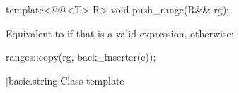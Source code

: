 \documentclass{wg21}
\begin{document}
\begin{addedblock}
\begin{itemdecl}
template<@@<T> R>
void push_range(R&& rg);
\end{itemdecl}

\begin{itemdescr}
    \pnum
    \effects
    Equivalent to  if that is a valid expression,
    otherwise:
    \begin{codeblock}
        ranges::copy(rg, back_inserter(c));
    \end{codeblock}
\end{itemdescr}
\end{addedblock}

[basic.string]{Class template }
\end{document}
